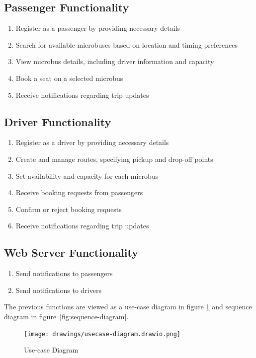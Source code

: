 \documentclass{BusMateSRS}
\begin{document}
\subsection{Passenger Functionality}
\begin{enumerate}
	\item Register as a passenger by providing necessary details
	\item Search for available microbuses based on location and timing preferences
	\item View microbus details, including driver information and capacity
	\item Book a seat on a selected microbus
	\item Receive notifications regarding trip updates
\end{enumerate}

\subsection{Driver Functionality}
\begin{enumerate}
	\item Register as a driver by providing necessary details
	\item Create and manage routes, specifying pickup and drop-off points
	\item Set availability and capacity for each microbus
	\item Receive booking requests from passengers
	\item Confirm or reject booking requests
	\item Receive notifications regarding trip updates
\end{enumerate}

\subsection{Web Server Functionality}
\begin{enumerate}
	\item Send notifications to passengers
	\item Send notifications to drivers
\end{enumerate}

The previous functions are viewed as a use-case diagram in
figure \ref{fig:usecase-diagram} and sequence diagram in figure~\ref{fig:sequence-diagram}.

\begin{figure}[ht!]
	\begin{center}
		\texttt{[image: drawings/usecase-diagram.drawio.png]}
	\end{center}
	\caption{Use-case Diagram}
	\label{fig:usecase-diagram}
\end{figure}
\end{document}
